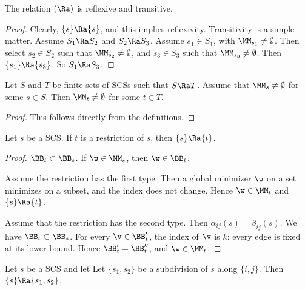 \begin{lemma}
The relation $(\Ra)$  is reflexive and transitive.
\end{lemma}

\begin{proof}  Clearly, $\{s \}\Ra \{s\}$, and this implies reflexivity.
Transitivity is a simple matter.  Assume
$S_1\Ra S_2$ and $S_2\Ra S_3$.  Assume $s_1\in S_1$, with $\MM_{s_1}\ne \emptyset$.
Then select
$s_2\in S_2$ such that $\MM_{s_2}\ne\emptyset$, and $s_3\in S_3$ such
that $\MM_{s_3}\ne\emptyset$.  Then $\{s_1\}\Ra\{s_3\}$.  So $S_1\Ra S_3$.
\end{proof}

\begin{lemma}\label{lemma:propagate}
Let $S$  and $T$ be finite sets of SCSs such that
$S\Ra T$.  Assume that $\MM_s\ne\emptyset$ for some $s\in S$.
Then $\MM_t\ne\emptyset$ for some $t\in T$.
\end{lemma}

\begin{proof} This follows directly from the definitions. 
\end{proof}

\begin{lemma}[restriction]
Let $s$ be a SCS.
If $t$ is a restriction of $s$, then $\{s\}\Ra \{t\}$.
\end{lemma}

\begin{proof}
$\BB_t\subset \BB_s$.
If $\w\in \MM_s$, then $\w\in \BB_t$.

Assume the restriction has the first type.  Then a global minimizer $\w$ on a set
minimizes on a subset,  and the index does not change.  Hence $\w\in \MM_t$ and $\{s\}\Ra\{t\}$.

Assume that the restriction has the second type. Then 
 $\alpha_{ij}(s)=\beta_{ij}(s)$.    We have $\BB_t\subset \BB_s$.
For every $\v\in \BB'_t$, the index of $\v$ is $k$: every edge is fixed at its lower bound.
Hence $\BB'_t = \BB''_t$, and $\w\in \MM_t$.
\end{proof}


\begin{lemma}[subdivision]
Let $s$ be a SCS and let
Let $\{s_1,s_2\}$ be a subdivision of $s$ along $\{i,j\}$.
Then $\{s\}\Ra\{s_1,s_2\}$.
\end{lemma}

